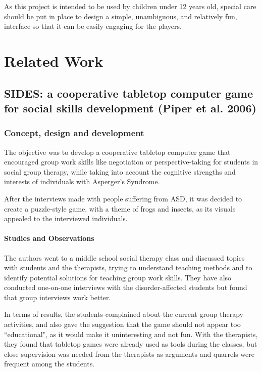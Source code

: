 \documentclass[runningheads]{llncs}
\begin{document}
\par As this project is intended to be used by children under 12 years old, special care should be put in place to design a simple, unambiguous, and relatively fun, interface so that it can be easily engaging for the players. 



\section{Related Work}

\subsection{SIDES: a cooperative tabletop computer game for social skills development (Piper et al. 2006)}

\subsubsection{Concept, design and development}

\par The objective was to develop a cooperative tabletop computer game that encouraged group work skills like negotiation or perspective-taking for students in social group therapy, while taking into account the cognitive strengths and interests of individuals with Asperger's Syndrome.
\par After the interviews made with people suffering from ASD, it was decided to create a puzzle-style game, with a theme of frogs and insects, as its visuals appealed to the interviewed individuals.

\paragraph{Studies and Observations} The authors went to a middle school social therapy class and discussed topics with students and the therapists, trying to understand teaching methods and to identify potential solutions for teaching group work skills. They have also conducted one-on-one interviews with the disorder-affected students but found that group interviews work better. 
\par In terms of results, the students complained about the current group therapy activities, and also gave the suggestion that the game should not appear too ``educational", as it would make it uninteresting and not fun. With the therapists, they found that tabletop games were already used as tools during the classes, but close supervision was needed from the therapists as arguments and quarrels were frequent among the students.
\end{document}
